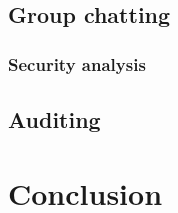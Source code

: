 \documentclass[11pt,en]{elegantpaper}
\begin{document}




\subsection{Group chatting}

\subsubsection{Security analysis}


\subsection{Auditing}



\section{Conclusion}




\end{document}

